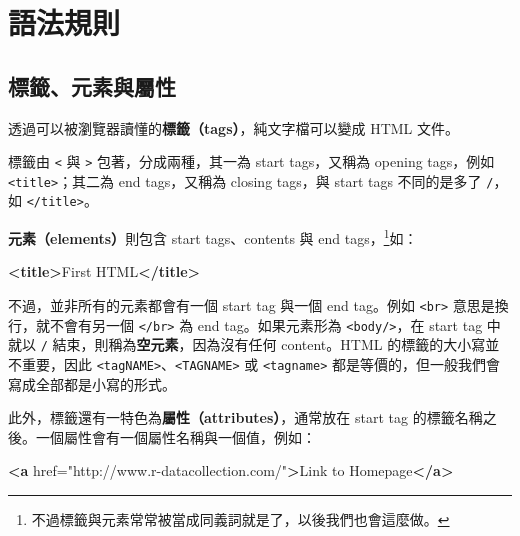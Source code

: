 \documentclass[
]{book}
\newenvironment{Shaded}{\begin{snugshade}}{\end{snugshade}}
\newcommand{\KeywordTok}[1]{\textcolor[rgb]{0.13,0.29,0.53}{\textbf{#1}}}
\newcommand{\NormalTok}[1]{#1}
\newcommand{\OtherTok}[1]{\textcolor[rgb]{0.56,0.35,0.01}{#1}}
\newcommand{\StringTok}[1]{\textcolor[rgb]{0.31,0.60,0.02}{#1}}
\let\oldfootnote\footnote
\renewcommand\footnote[1]{\oldfootnote{%
\renewcommand\baselinestretch{1.1}%
\large\footnotesize\ignorespaces#1}}
\theoremstyle{definition}
\theoremstyle{remark}
\begin{document}
\hypertarget{htmlsyntax}{%
\section{語法規則}\label{htmlsyntax}}

\hypertarget{ux6a19ux7c64ux5143ux7d20ux8207ux5c6cux6027}{%
\subsection{標籤、元素與屬性}\label{ux6a19ux7c64ux5143ux7d20ux8207ux5c6cux6027}}

透過可以被瀏覽器讀懂的\textbf{標籤（tags）}，純文字檔可以變成 HTML 文件。

標籤由 \texttt{\textless{}} 與 \texttt{\textgreater{}} 包著，分成兩種，其一為 start tags，又稱為 opening tags，例如 \texttt{\textless{}title\textgreater{}}；其二為 end tags，又稱為 closing tags，與 start tags 不同的是多了 \texttt{/}，如 \texttt{\textless{}/title\textgreater{}}。

\textbf{元素（elements）}則包含 start tags、contents 與 end tags，\footnote{不過標籤與元素常常被當成同義詞就是了，以後我們也會這麼做。}如：

\begin{Shaded}
\begin{Highlighting}[]
\KeywordTok{\textless{}title\textgreater{}}\NormalTok{First HTML}\KeywordTok{\textless{}/title\textgreater{}}
\end{Highlighting}
\end{Shaded}

不過，並非所有的元素都會有一個 start tag 與一個 end tag。例如 \texttt{\textless{}br\textgreater{}} 意思是換行，就不會有另一個 \texttt{\textless{}/br\textgreater{}} 為 end tag。如果元素形為 \texttt{\textless{}body/\textgreater{}}，在 start tag 中就以 \texttt{/} 結束，則稱為\textbf{空元素}，因為沒有任何 content。HTML 的標籤的大小寫並不重要，因此 \texttt{\textless{}tagNAME\textgreater{}}、\texttt{\textless{}TAGNAME\textgreater{}} 或 \texttt{\textless{}tagname\textgreater{}} 都是等價的，但一般我們會寫成全部都是小寫的形式。

此外，標籤還有一特色為\textbf{屬性（attributes）}，通常放在 start tag 的標籤名稱之後。一個屬性會有一個屬性名稱與一個值，例如：

\begin{Shaded}
\begin{Highlighting}[]
\KeywordTok{\textless{}a}\OtherTok{ href=}\StringTok{"http://www.r{-}datacollection.com/"}\KeywordTok{\textgreater{}}\NormalTok{Link to Homepage}\KeywordTok{\textless{}/a\textgreater{}}
\end{Highlighting}
\end{Shaded}
\end{document}
